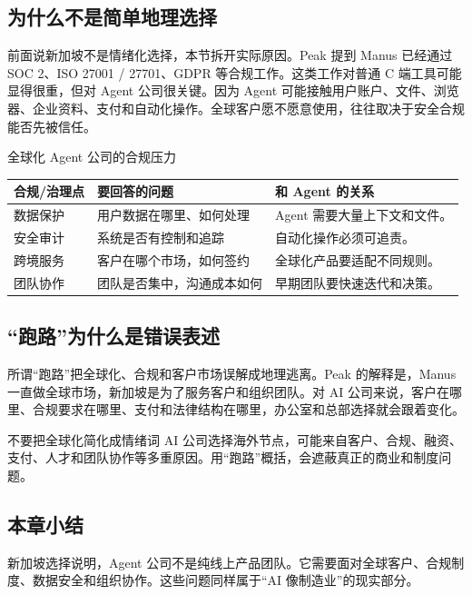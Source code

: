 \documentclass[a4paper]{article}
\begin{document}
\subsection{为什么不是简单地理选择}

前面说新加坡不是情绪化选择，本节拆开实际原因。Peak 提到 Manus 已经通过 SOC 2、ISO 27001 / 27701、GDPR 等合规工作。这类工作对普通 C 端工具可能显得很重，但对 Agent 公司很关键。因为 Agent 可能接触用户账户、文件、浏览器、企业资料、支付和自动化操作。全球客户愿不愿意使用，往往取决于安全合规能否先被信任。

\begin{knowledgebox}{全球化 Agent 公司的合规压力}
\begin{tabularx}{\textwidth}{p{}p{}X}
\toprule
合规/治理点 & 要回答的问题 & 和 Agent 的关系 \\
\midrule
数据保护 & 用户数据在哪里、如何处理 & Agent 需要大量上下文和文件。 \\
安全审计 & 系统是否有控制和追踪 & 自动化操作必须可追责。 \\
跨境服务 & 客户在哪个市场，如何签约 & 全球化产品要适配不同规则。 \\
团队协作 & 团队是否集中，沟通成本如何 & 早期团队要快速迭代和决策。 \\
\bottomrule
\end{tabularx}
\end{knowledgebox}

\subsection{“跑路”为什么是错误表述}

所谓“跑路”把全球化、合规和客户市场误解成地理逃离。Peak 的解释是，Manus 一直做全球市场，新加坡是为了服务客户和组织团队。对 AI 公司来说，客户在哪里、合规要求在哪里、支付和法律结构在哪里，办公室和总部选择就会跟着变化。

\begin{warningbox}{不要把全球化简化成情绪词}
AI 公司选择海外节点，可能来自客户、合规、融资、支付、人才和团队协作等多重原因。用“跑路”概括，会遮蔽真正的商业和制度问题。
\end{warningbox}

\subsection{本章小结}

新加坡选择说明，Agent 公司不是纯线上产品团队。它需要面对全球客户、合规制度、数据安全和组织协作。这些问题同样属于“AI 像制造业”的现实部分。
\end{document}
